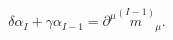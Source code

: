 \begin{equation}
\delta \alpha _{I}+\gamma \alpha _{I-1}=\partial ^{\mu }\stackrel{(I-1)}{m}%
_{\mu }.  \label{cin21}
\end{equation}

